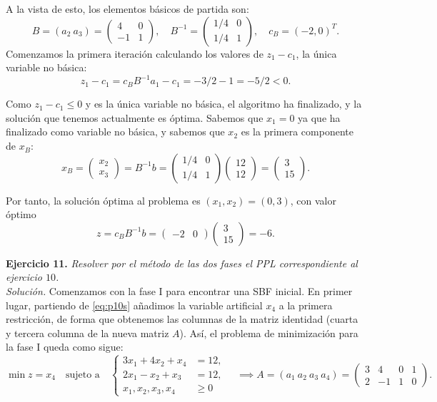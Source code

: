 \documentclass[11pt,a4paper]{article}
\begin{document}
A la vista de esto, los elementos básicos de partida son:
\[
B=(a_2 \ a_3)=\begin{pmatrix}
  4 & 0\\
  -1 & 1
\end{pmatrix}, \quad
B^{-1}=\begin{pmatrix}
1/4 & 0\\
1/4 & 1
\end{pmatrix}, \quad c_B = (-2, 0)^T.
\]
Comenzamos la primera iteración calculando los valores de $z_1-c_1$, la única variable no básica:
\[
z_1-c_1=c_BB^{-1}a_1 - c_1 = -3/2 - 1 = -5/2 < 0.
\]

Como $z_1-c_1 \leq 0$ y es la única variable no básica, el algoritmo ha finalizado, y la solución que tenemos actualmente es óptima. Sabemos que $x_1=0$ ya que ha finalizado como variable no básica, y sabemos que $x_2$ es la primera componente de $x_B$:
\[
x_B = \begin{pmatrix}
  x_2\\x_3
\end{pmatrix}=B^{-1}b=\begin{pmatrix}
1/4 & 0\\
1/4 & 1
\end{pmatrix}\begin{pmatrix}
  12\\12
\end{pmatrix}=\begin{pmatrix}
  3\\15
\end{pmatrix}.
\]

Por tanto, la solución óptima al problema es $(x_1,x_2)=(0, 3)$, con valor óptimo \[z=c_BB^{-1}b=\begin{pmatrix}
  -2 & 0
\end{pmatrix}\begin{pmatrix}
  3\\15
\end{pmatrix}=-6.\]

\textbf{Ejercicio 11.} \emph{Resolver por el método de las dos fases el PPL correspondiente al ejercicio $10$.}\\

\textit{Solución.} Comenzamos con la fase I para encontrar una SBF inicial. En primer lugar, partiendo de \eqref{eq:p10s} añadimos la variable artificial $x_4$ a la primera restricción, de forma que obtenemos las columnas de la matriz identidad (cuarta y tercera columna de la nueva matriz $A$). Así, el problema de minimización para la fase I queda como sigue:
\[
  \min z = x_4 \quad \text{sujeto a} \quad \begin{cases} 3x_{1} + 4x_{2} + x_4 &= 12,\\ 2x_{1} - x_{2} + x_3 &= 12,\\ x_{1}, x_{2}, x_3, x_4 &\geq 0 \end{cases} \quad \implies A =(a_1 \ a_2 \ a_3 \ a_4)=\begin{pmatrix}
  3 & 4 & 0 & 1\\
  2 & -1 & 1 & 0
\end{pmatrix}.
\]
\end{document}
